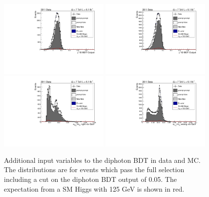 \begin{figure}[hbt!]
  \includegraphics[width=0.48\textwidth]{hgg7TeV/variablePlots/phoid_1}
  \includegraphics[width=0.48\textwidth]{hgg7TeV/variablePlots/phoid_2}\\
  \includegraphics[width=0.48\textwidth]{hgg7TeV/variablePlots/sigmrv}
  \includegraphics[width=0.48\textwidth]{hgg7TeV/variablePlots/sigmwv}
 \caption{Additional input variables to the diphoton BDT in data and MC. 
	  The distributions are for events which pass the full selection 
	  including a cut on the diphoton BDT output of 0.05.
 	  The expectation from a SM Higgs with 125 GeV is shown in red.}
 \label{fig:diphotonbdtvars2}
\end{figure}

